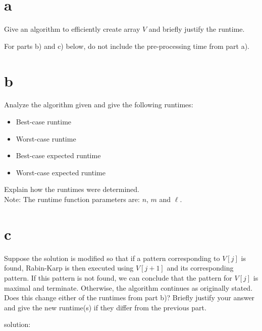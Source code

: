\documentclass[12pt]{article}
\begin{document}
	\begin{enumerate}
		\part{a} Give an algorithm to efficiently create array $V$ and briefly justify the runtime.
		
		For parts b) and c) below, do not include the pre-processing time from part a).
		
		\part{b} Analyze the algorithm given and give the following runtimes:
		\begin{itemize}
			\item Best-case runtime
			\item Worst-case runtime
			\item Best-case expected runtime
			\item Worst-case expected runtime
		\end{itemize}
		Explain how the runtimes were determined. \\
		Note: The runtime function parameters are: $n$, $m$ and $\ell$.
		
		\part{c} Suppose the solution is modified so that if a pattern corresponding to $V[j]$ is found, Rabin-Karp is then executed using $V[j+1]$ and its corresponding pattern.  
		If this pattern is not found, we can conclude that the pattern for $V[j]$ is maximal and terminate.  
		Otherwise, the algorithm continues as originally stated. \\
		Does this change either of the runtimes from part b)?  Briefly justify your answer and give the new runtime(s) if they differ from the previous part. \\
		
	\end{enumerate}
	
	
	
	solution:
	
\end{document}
